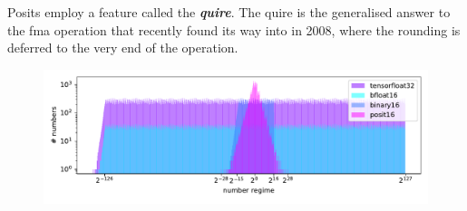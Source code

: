 \documentclass{article}
\theoremstyle{plain} %
\theoremstyle{convention} %
\theoremstyle{remark} %
\def\df#1{\textbf{\textit{#1}}}
\numberwithin{equation}{section}
\begin{document}
Posits employ a feature called the \df{quire}. The \gls{quire} is the generalised answer to the \gls{fma} operation that recently found its way into \cite{ieee754_2008} in 2008, where the rounding is deferred to the very end of the operation.

\begin{figure}[ht]
    \centering
    \includegraphics[width=1.0\textwidth]{plots/number_line2}

\end{figure}
\end{document}
